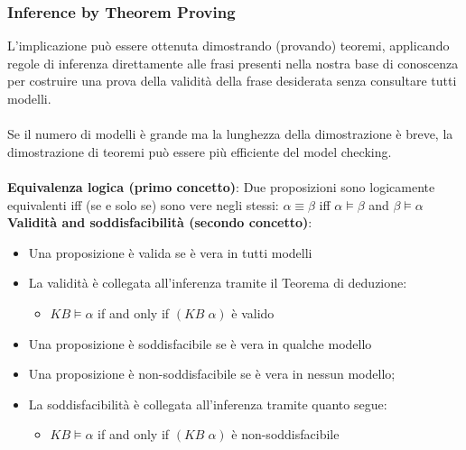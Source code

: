 \documentclass[../main.tex]{subfiles}
\begin{document}
	\subsubsection{Inference by Theorem Proving}
	L’implicazione può essere ottenuta dimostrando (provando) teoremi, applicando regole di inferenza direttamente alle frasi presenti nella nostra base di conoscenza per costruire una prova della validità della frase desiderata senza consultare tutti modelli.\\\\
	Se il numero di modelli è grande ma la lunghezza della dimostrazione è breve, la dimostrazione di teoremi può essere più efficiente del model checking.\\\\
	\textbf{Equivalenza logica (primo concetto)}: Due proposizioni sono logicamente equivalenti iff (se e solo se) sono vere negli stessi: $\alpha \equiv \beta $ iff $\alpha \vDash \beta$ and $\beta \vDash \alpha$\\
	\textbf{Validità and soddisfacibilità (secondo concetto)}:
	\begin{itemize}
		\item Una proposizione è valida se è vera in tutti modelli
		\item La validità è collegata all'inferenza tramite il Teorema di deduzione:
		\begin{itemize}
			\item $KB \vDash \alpha$ if and only if $(KB \; \alpha)$ è valido
		\end{itemize}
		\item Una proposizione è soddisfacibile se è vera in qualche modello
		\item Una proposizione è non-soddisfacibile se è vera in nessun modello;
		\item La soddisfacibilità è collegata all'inferenza tramite quanto segue:
		\begin{itemize}
			\item $KB \vDash \alpha$ if and only if $(KB \; \alpha)$ è non-soddisfacibile
		\end{itemize}
	\end{itemize}
\end{document}
